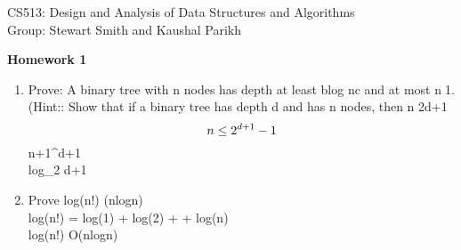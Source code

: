 \documentclass[11pt]{article}
\begin{document}

\noindent CS513: Design and Analysis of Data Structures and Algorithms \\
Group: Stewart Smith and Kaushal Parikh\\

\begin{center}
    \LARGE{\textbf{Homework 1}}\\
\end{center}

\vspace{.1in}


\begin{enumerate}

\item Prove: A binary tree with n nodes has depth at least blog nc and at most n􀀀1. (Hint:: Show that if a binary tree has depth d and has n nodes, then n  2d+1 􀀀 \\
    $$n\leq 2^{d+1}-1\\
    $$n+1^{d+1}\\
    log_2 \leq d+1\\

\item Prove log(n!) \in \Theta({nlogn})\\
    log(n!) = log(1) + log(2) + \cdots + log(n) \\
    log(n!) \in O(nlogn)\\


\end{enumerate}
\end{document}
